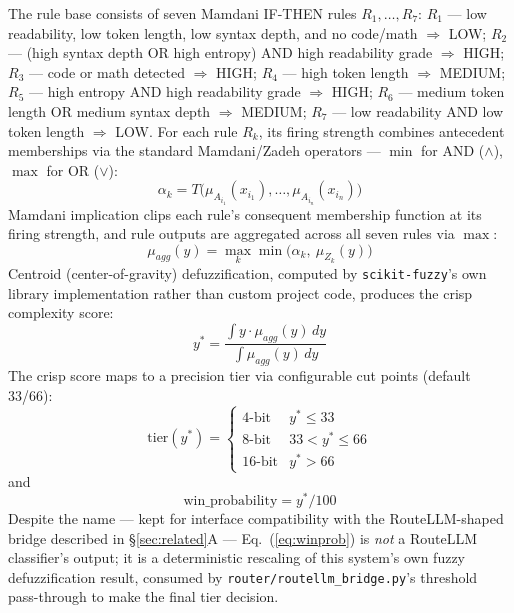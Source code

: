 \documentclass[conference]{IEEEtran}
\begin{document}
The rule base consists of seven Mamdani IF-THEN rules $R_1,\dots,R_7$:
$R_1$ --- low readability, low token length, low syntax depth, and no
code/math $\Rightarrow$ LOW; $R_2$ --- (high syntax depth OR high
entropy) AND high readability grade $\Rightarrow$ HIGH; $R_3$ --- code or
math detected $\Rightarrow$ HIGH; $R_4$ --- high token length
$\Rightarrow$ MEDIUM; $R_5$ --- high entropy AND high readability grade
$\Rightarrow$ HIGH; $R_6$ --- medium token length OR medium syntax depth
$\Rightarrow$ MEDIUM; $R_7$ --- low readability AND low token length
$\Rightarrow$ LOW. For each rule $R_k$, its firing strength combines
antecedent memberships via the standard Mamdani/Zadeh operators --- $\min$
for AND ($\wedge$), $\max$ for OR ($\vee$):
\begin{equation}
\alpha_k = T\big(\mu_{A_{i_1}}(x_{i_1}), \dots, \mu_{A_{i_n}}(x_{i_n})\big)
\label{eq:firing}
\end{equation}
Mamdani implication clips each rule's consequent membership function at
its firing strength, and rule outputs are aggregated across all seven
rules via $\max$:
\begin{equation}
\mu_{agg}(y) = \max_k \min\big(\alpha_k,\ \mu_{Z_k}(y)\big)
\label{eq:agg}
\end{equation}
Centroid (center-of-gravity) defuzzification, computed by
\texttt{scikit-fuzzy}'s own library implementation rather than custom
project code, produces the crisp complexity score:
\begin{equation}
y^{*} = \frac{\int y \cdot \mu_{agg}(y)\, dy}{\int \mu_{agg}(y)\, dy}
\label{eq:centroid}
\end{equation}
The crisp score maps to a precision tier via configurable cut points
(default 33/66):
\begin{equation}
\text{tier}(y^{*}) =
\begin{cases}
\text{4-bit} & y^{*} \le 33 \\
\text{8-bit} & 33 < y^{*} \le 66 \\
\text{16-bit} & y^{*} > 66
\end{cases}
\label{eq:tiermap}
\end{equation}
and
\begin{equation}
\text{win\_probability} = y^{*}/100
\label{eq:winprob}
\end{equation}
Despite the name --- kept for interface compatibility with the
RouteLLM-shaped bridge described in \S\ref{sec:related}A --- Eq.~(\ref{eq:winprob})
is \emph{not} a RouteLLM classifier's output; it is a deterministic
rescaling of this system's own fuzzy defuzzification result, consumed by
\texttt{router/routellm\_bridge.py}'s threshold pass-through to make the
final tier decision.
\end{document}
